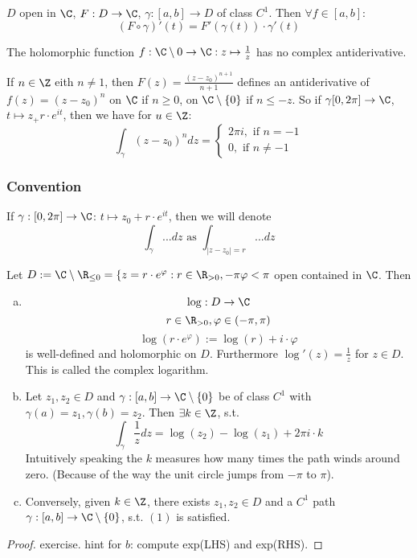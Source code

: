 \begin{corollary}%
  $D$ open in $\C$, $F:D\to\C$, $\gamma:[a,b]\to D$ of class $C^1$. Then $\forall f\in [a,b]$:
    $$\left(F\circ \gamma\right)'(t)=F'\left(\gamma(t)\right)\cdot\gamma'(t)$$
\end{corollary}
\begin{corollary}%
  The holomorphic function $f:\C\setminus{0}\to \C: z\mapsto\frac{1}{z}$ has no complex antiderivative.
\end{corollary}
\begin{example}
  If $n\in \Z$ eith $n\neq 1$, then $F(z)=\frac{(z-z_0)^{n+1}}{n+1}$ defines an antiderivative of $f(z)=(z-z_0)^{n}$ on $\C$ if $n\geq 0$, on $\C\setminus \{ 0\}$ if $n\leq -z$.
  \newline So if $\gamma[0,2\pi]\to \C$, $t\mapsto z_+r\cdot e^{it}$, then we have for $u\in \Z$:
    $$\int_{\gamma}(z-z_0)^ndz=
      \begin{cases}
          2\pi i, \text{ if }n=-1 \\
          0 , \text{ if }n\neq -1
      \end{cases}
    $$
\end{example}
\subsubsection*{Convention}
If $\gamma: [0,2\pi]\to \C$: $t\mapsto z_0+r\cdot e^{it}$, then we will denote
  $$\int_{\gamma}...dz \text{ as }\int_{|z-z_0|=r} ... dz$$
\begin{proposition}
  Let $D:=\C\setminus\R_{\leq 0}=\{ z=r\cdot e^{\varphi}: r\in \R_{>0}, -\pi\varphi<\pi$ open contained in $\C$.
  \newline Then
  \begin{enumerate}[(a)]
    \item
      $$\log: D\to \C$$
      $$r\in \R_{>0}, \varphi \in (-\pi, \pi)$$
      $$\log(r\cdot e^{\varphi}):=\log(r)+i\cdot\varphi$$
    is well-defined and holomorphic on $D$. Furthermore $\log'(z)=\frac{1}{z}$ for $z\in D$. This is called the complex logarithm.
    \item
      Let $z_1,z_2\in D$ and $\gamma:[a,b]\to \C\setminus \{ 0\}$ be of class $C^1$ with $\gamma(a)=z_1,\gamma(b)=z_2$. Then $\exists k \in \Z$, s.t.
\begin{equation}
        \int_{\gamma}\frac{1}{z}dz=\log(z_2)-\log(z_1)+2\pi i\cdot k
\end{equation}
      Intuitively speaking the $k$ measures how many times the path winds around zero. (Because of the way the unit circle jumps from $-\pi$ to $\pi$).
    \item
      Conversely, given $k\in \Z$, there exists $z_1,z_2\in D$ and a $C^1$ path $\gamma:[a,b]\to \C\setminus\{ 0\}$, s.t. $(1)$ is satisfied.
\end{enumerate}
\end{proposition}
\begin{proof}
  exercise.
  hint for $b$: compute exp(LHS) and exp(RHS).
\end{proof}

